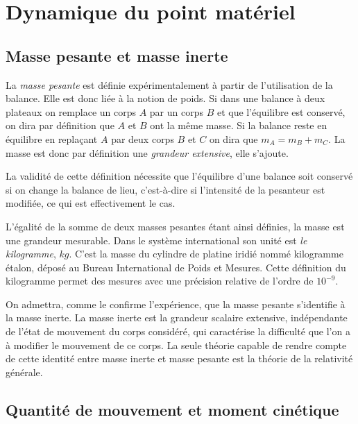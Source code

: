 \chapter{Dynamique du point matériel}%
\label{chap:dynamiquedupoint}%
\minitoc{}
\minilof{}
\minilot{}

\section{Masse pesante et masse inerte}%
\label{chap2-sec:massepesantemasseinerte}%

\begin{defdef}%
  La \emph{masse pesante} est définie expérimentalement à partir
  de l'utilisation de la balance. Elle est donc liée à la notion de poids. Si
  dans une balance à deux plateaux on remplace un corps \(A\) par un corps 
  \(B\) et
  que l'équilibre est conservé, on dira par définition que \(A\) et \(B\) ont 
  la
  même masse. Si la balance reste en équilibre en replaçant \(A\) par deux 
  corps
 \(B\) et \(C\) on dira que \(m_A=m_B+m_C\). La masse est donc par définition 
  une
  \emph{grandeur extensive}, elle s'ajoute.
\end{defdef}%

La validité de cette définition nécessite que l'équilibre d'une balance soit
conservé si on change la balance de lieu, c'est-à-dire si l'intensité de la
pesanteur est modifiée, ce qui est effectivement le cas.

L'égalité de la somme de deux masses pesantes étant ainsi définies, la masse
est une grandeur mesurable. Dans le système international son unité est
\emph{le kilogramme}, \(\si{kg}\). C'est la masse du cylindre de platine 
iridié%
nommé kilogramme étalon, déposé au Bureau International de Poids et Mesures.
Cette définition du kilogramme permet des mesures avec une précision relative
de l'ordre de \(10^{-9}\).

On admettra, comme le confirme l'expérience, que la masse pesante s'identifie à
la masse inerte. La masse inerte est la grandeur scalaire extensive,
indépendante de l'état de mouvement du corps considéré, qui caractérise la
difficulté que l'on a à modifier le mouvement de ce corps. La seule théorie
capable de rendre compte de cette identité entre masse inerte et masse pesante
est la théorie de la relativité générale.


\section{Quantité de mouvement et moment cinétique}%
\label{chap2-sec:quantitedemouvementetmomentcinetique}%

